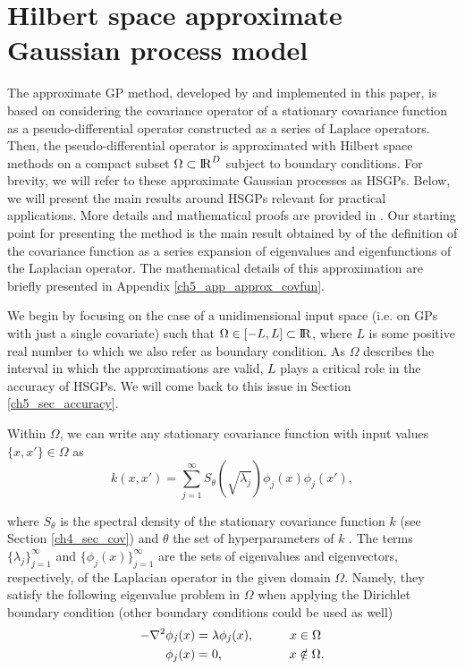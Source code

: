 \documentclass[onecolumn,a4paper,11pt]{article}
\begin{document}
\section{Hilbert space approximate Gaussian process model}\label{ch5_sec_method}

The approximate GP method, developed by \cite{solin2018hilbert} and implemented in this paper, is based on considering the covariance operator of a stationary covariance function as a pseudo-differential operator constructed as a series of Laplace operators. Then, the pseudo-differential operator is approximated with Hilbert space methods on a compact subset $\Omega \subset {\rm I\!R}^D$ subject to boundary conditions. For brevity, we will refer to these approximate Gaussian processes as HSGPs. Below, we will present the main results around HSGPs relevant for practical applications. More details and mathematical proofs are provided in \cite{solin2018hilbert}. Our starting point for presenting the method is the main result obtained by \cite{solin2018hilbert} of the definition of the covariance function as a series expansion of eigenvalues and eigenfunctions of the Laplacian operator. The mathematical details of this approximation are briefly presented in Appendix \ref{ch5_app_approx_covfun}.

We begin by focusing on the case of a unidimensional input space (i.e. on GPs with just a single covariate) such that $\Omega \in [-L,L] \subset {\rm I\!R}$, where $L$ is some positive real number to which we also refer as boundary condition. As $\Omega$ describes the interval in which the approximations are valid, $L$ plays a critical role in the accuracy of HSGPs. We will come back to this issue in Section \ref{ch5_sec_accuracy}.

Within $\Omega$, we can write any stationary covariance function with input values $\{x,x'\} \in \Omega$ as
%
\begin{equation}\label{eq_approxcov}
k(x,x') = \sum_{j=1}^\infty S_{\theta}(\sqrt{\lambda_j}) \phi_j(x) \phi_j(x'),
\end{equation} 

\noindent where $S_{\theta}$ is the spectral density of the stationary covariance function $k$ (see Section \ref{ch4_sec_cov}) and $\theta$ the set of hyperparameters of $k$ \citep{rasmussen2006gaussian}. The terms $\{\lambda_j\}_{j=1}^{\infty}$ and $\{\phi_j(x)\}_{j=1}^{\infty}$ are the sets of eigenvalues and eigenvectors, respectively, of the Laplacian operator in the given domain $\Omega$. Namely, they satisfy the following eigenvalue problem in $\Omega$ when applying the Dirichlet boundary condition (other boundary conditions could be used as well)
%
\begin{align}\label{eq_eigenproblem}
\begin{split}
-\nabla^2 \phi_j(x)&=\lambda \phi_j(x), \hspace{1cm}  x \in \Omega \\ 
\phi_j(x)&= 0, \hspace{1.85cm}   x \notin \Omega.
\end{split}
\end{align} 
\end{document}
